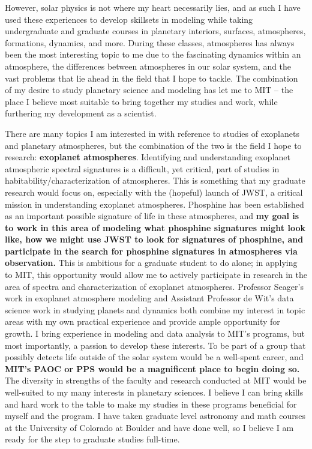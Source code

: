 \documentclass[11pt,letterpaper]{article}
\begin{document}
However, solar physics is not where my heart necessarily lies, and as such I have used these experiences to develop skillsets in modeling while taking undergraduate and graduate courses in planetary interiors, surfaces, atmospheres, formations, dynamics, and more. During these classes, atmospheres has always been the most interesting topic to me due to the fascinating dynamics within an atmosphere, the differences between atmospheres in our solar system, and the vast problems that lie ahead in the field that I hope to tackle. The combination of my desire to study planetary science and modeling has let me to MIT -- the place I believe most suitable to bring together my studies and work, while furthering my development as a scientist.

There are many topics I am interested in with reference to studies of exoplanets and planetary atmospheres, but the combination of the two is the field I hope to research: \textbf{exoplanet atmospheres}. Identifying and understanding exoplanet atmospheric spectral signatures is a difficult, yet critical, part of studies in habitability/characterization of atmospheres. This is something that my graduate research would focus on, especially with the (hopeful) launch of JWST, a critical mission in understanding exoplanet atmospheres. Phosphine has been established as an important possible signature of life in these atmospheres, and \textbf{my goal is to work in this area of modeling what phosphine signatures might look like, how we might use JWST to look for signatures of phosphine, and participate in the search for phosphine signatures in atmospheres via observation.} This is ambitious for a graduate student to do alone; in applying to MIT, this opportunity would allow me to actively participate in research in the area of spectra and characterization of exoplanet atmospheres. Professor Seager’s work in exoplanet atmosphere modeling and Assistant Professor de Wit’s data science work in studying planets and dynamics both combine my interest in topic areas with my own practical experience and provide ample opportunity for growth. I bring experience in modeling and data analysis to MIT’s programs, but most importantly, a passion to develop these interests. To be part of a group that possibly detects life outside of the solar system would be a well-spent career, and \textbf{MIT’s PAOC or PPS would be a magnificent place to begin doing so.} The diversity in strengths of the faculty and research conducted at MIT would be well-suited to my many interests in planetary sciences. I believe I can bring skills and hard work to the table to make my studies in these programs beneficial for myself and the program. I have taken graduate level astronomy and math courses at the University of Colorado at Boulder and have done well, so I believe I am ready for the step to graduate studies full-time.
\end{document}

